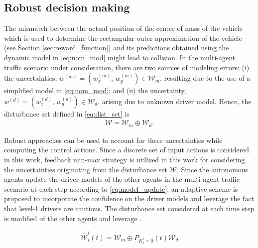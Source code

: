 \documentclass[10pt,journal]{IEEEtran}
\begin{document}
	\subsection{Robust decision making}
	\label{sec:robust}

	The mismatch between the actual position of the center of mass of the vehicle which is used to determine the rectangular outer approximation of the vehicle (see Section \ref{sec:reward_function}) and its predictions obtained using the dynamic model in \eqref{eq:nom_mod} might lead to collision. In the multi-agent traffic scenario under consideration, there are two sources of modeling errors: (i) the uncertainties, $w^{(m)} = \left(w_x^{(m)},\,w_y^{(m)}\right) \in \mathcal{W}_m$, resulting due to the use of a simplified model in \eqref{eq:nom_mod}; and (ii) the uncertainty, $w^{(d)} = \left(w_x^{(d)},\,w_y^{(d)}\right) \in \mathcal{W}_d$, arising due to unknown driver model. Hence, the disturbance set defined in \eqref{eq:dist_set} is 
	\begin{align}
		\mathcal{W} = \mathcal{W}_m \oplus \mathcal{W}_d.
		\label{eq:full_dist_set}	
	\end{align}
	 	
	
	
	Robust approaches can be used to account for these uncertainties while computing the control actions. Since a discrete set of input actions is considered in this work, feedback min-max strategy \cite{Scokaert1998} is utilized in this work for considering the uncertainties originating from the disturbance set $\mathcal{W}$. Since the autonomous agents update the driver models of the other agents in the multi-agent traffic scenario at each step according to \eqref{eq:model_update}, an adaptive scheme is proposed to incorporate the confidence on the driver models and leverage the fact that level-1 drivers are cautious. The disturbance set considered at each time step is modified  of the other agents and leverage .

	

	\begin{align}
		\bar{\mathcal{W}}_{i}^{l}(t) = \mathcal{W}_m \oplus P_{K_{i}^l = 0}(t) \mathcal{W}_d
		\label{eq:adaptive_dist_set}
	\end{align}
\end{document}

